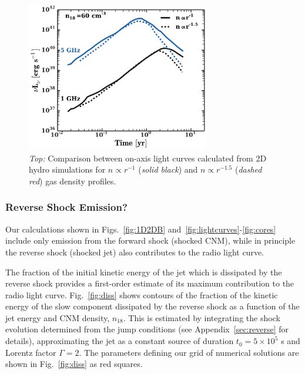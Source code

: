 \documentclass[usenatbib,fleqn]{mnras}
\begin{document}
\begin{figure} 
  \includegraphics[width=8cm]{prof2D.pdf}
  \caption{\label{fig:prof2D} {\it Top:} Comparison between on-axis
    light curves calculated from 2D hydro simulations for $n\propto
    r^{-1}$ ({\it solid black}) and $n\propto r^{-1.5}$ ({\it dashed
      red}) gas density profiles.}
\end{figure}


\subsubsection{Reverse Shock Emission?}
Our calculations shown in Figs.~\ref{fig:1D2DB}
and~\ref{fig:lightcurves}-\ref{fig:cores} include only emission from
the forward shock (shocked CNM), while in principle the reverse shock
(shocked jet) also contributes to the radio light curve.

The fraction of the initial kinetic energy of the jet which is
dissipated by the reverse shock provides a first-order estimate of its
maximum contribution to the radio light curve.  Fig.~\ref{fig:diss}
shows contours of the fraction of the kinetic energy of the slow
component dissipated by the reverse shock as a function of the jet
energy and CNM density, $n_{18}$.  This is estimated by integrating
the shock evolution determined from the jump conditions (see
Appendix~\ref{sec:reverse} for details), approximating the jet as a
constant source of duration $t_0 = 5 \times 10^{5}$ s and Lorentz
factor $\Gamma = 2$.  The parameters defining our grid of numerical
solutions are shown in Fig.~\ref{fig:diss} as red squares.
\end{document}

